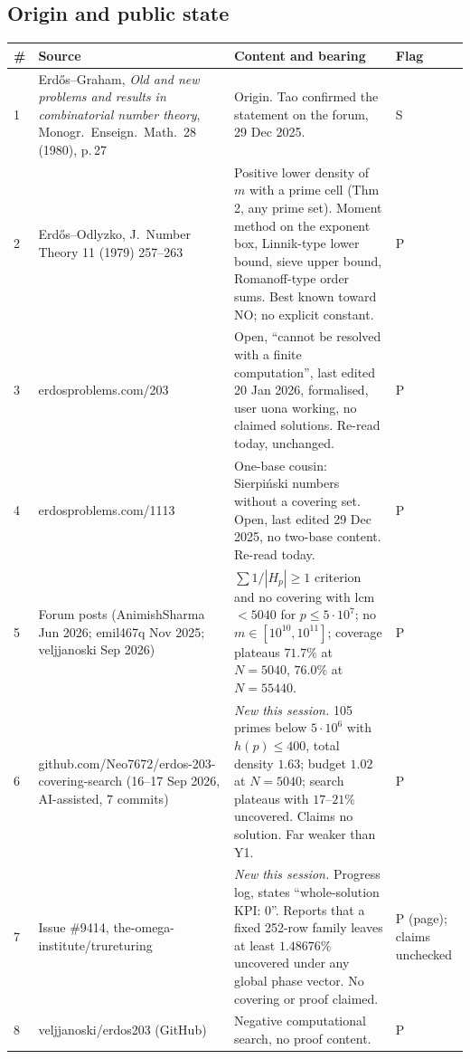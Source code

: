 \documentclass[11pt,a4paper]{article}
\begin{document}
\subsection{Origin and public state}
\begin{longtable}{P{0.7cm}P{5.3cm}P{7.5cm}P{1.3cm}}
\toprule
\# & Source & Content and bearing & Flag\\\midrule
{} & Erd\H{o}s--Graham, \emph{Old and new problems and results in combinatorial number theory}, Monogr.\ Enseign.\ Math.\ 28 (1980), p.\,27 & Origin. Tao confirmed the statement on the forum, 29 Dec 2025. & S\\
2 & Erd\H{o}s--Odlyzko, J.\ Number Theory 11 (1979) 257--263 & Positive lower density of $m$ with a prime cell (Thm 2, any prime set). Moment method on the exponent box, Linnik-type lower bound, sieve upper bound, Romanoff-type order sums. Best known toward NO; no explicit constant. & P\\
3 & erdosproblems.com/203 & Open, ``cannot be resolved with a finite computation'', last edited 20 Jan 2026, formalised, user uona working, no claimed solutions. Re-read today, unchanged. & P\\
4 & erdosproblems.com/1113 & One-base cousin: Sierpi\'nski numbers without a covering set. Open, last edited 29 Dec 2025, no two-base content. Re-read today. & P\\
5 & Forum posts (AnimishSharma Jun 2026; emil467q Nov 2025; veljjanoski Sep 2026) & $\sum1/|H_p|\ge1$ criterion and no covering with lcm $<5040$ for $p\le5\cdot10^7$; no $m\in[10^{10},10^{11}]$; coverage plateaus $71.7\%$ at $N=5040$, $76.0\%$ at $N=55440$. & P\\
6 & github.com/Neo7672/erdos-203-covering-search (16--17 Sep 2026, AI-assisted, 7 commits) & \emph{New this session.} 105 primes below $5\cdot10^6$ with $h(p)\le400$, total density $1.63$; budget $1.02$ at $N=5040$; search plateaus with $17$--$21\%$ uncovered. Claims no solution. Far weaker than Y1. & P\\
7 & Issue \#9414, the-omega-institute/trureturing & \emph{New this session.} Progress log, states ``whole-solution KPI: 0''. Reports that a fixed 252-row family leaves at least $1.48676\%$ uncovered under any global phase vector. No covering or proof claimed. & P (page); claims unchecked\\
8 & veljjanoski/erdos203 (GitHub) & Negative computational search, no proof content. & P\\
\bottomrule
\end{longtable}
\end{document}
